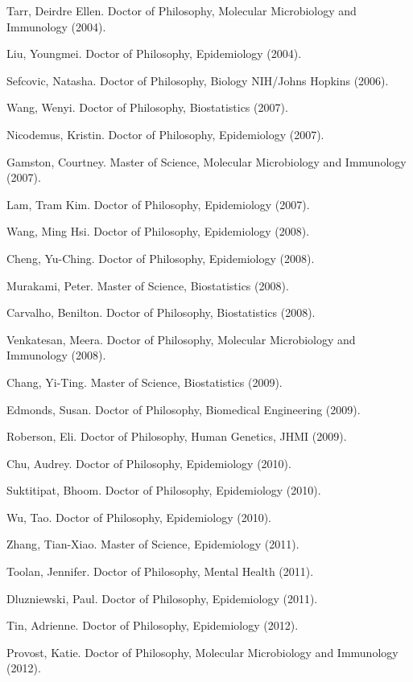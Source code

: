 \documentclass[10pt]{article}
\newcommand{\dn}[1]{{\color{black} {#1}}}
\begin{document}
\item \dn{Tarr}, Deirdre Ellen. Doctor of Philosophy, Molecular Microbiology and Immunology (2004).
\item \dn{Liu}, Youngmei. Doctor of Philosophy, Epidemiology (2004).
\item \dn{Sefcovic}, Natasha. Doctor of Philosophy, Biology NIH/Johns Hopkins (2006).
\item \dn{Wang}, Wenyi. Doctor of Philosophy, Biostatistics (2007).
\item \dn{Nicodemus}, Kristin. Doctor of Philosophy, Epidemiology (2007).
\item \dn{Gamston}, Courtney. Master of Science, Molecular Microbiology and Immunology (2007).
\item \dn{Lam}, Tram Kim. Doctor of Philosophy, Epidemiology (2007).
\item \dn{Wang}, Ming Hsi. Doctor of Philosophy, Epidemiology (2008).
\item \dn{Cheng}, Yu-Ching. Doctor of Philosophy, Epidemiology (2008).
\item \dn{Murakami}, Peter. Master of Science, Biostatistics (2008).
\item \dn{Carvalho}, Benilton. Doctor of Philosophy, Biostatistics (2008).
\item \dn{Venkatesan}, Meera. Doctor of Philosophy, Molecular Microbiology and Immunology (2008).
\item \dn{Chang}, Yi-Ting. Master of Science, Biostatistics (2009).
\item \dn{Edmonds}, Susan. Doctor of Philosophy, Biomedical Engineering (2009).
\item \dn{Roberson}, Eli. Doctor of Philosophy, Human Genetics, JHMI (2009).  
\item \dn{Chu}, Audrey. Doctor of Philosophy, Epidemiology (2010).
\item \dn{Suktitipat}, Bhoom. Doctor of Philosophy, Epidemiology (2010).
\item \dn{Wu}, Tao. Doctor of Philosophy, Epidemiology (2010).
\item \dn{Zhang}, Tian-Xiao. Master of Science, Epidemiology (2011).
\item \dn{Toolan}, Jennifer. Doctor of Philosophy, Mental Health (2011).
\item \dn{Dluzniewski}, Paul. Doctor of Philosophy, Epidemiology (2011).
\item \dn{Tin}, Adrienne. Doctor of Philosophy, Epidemiology (2012).
\item \dn{Provost}, Katie. Doctor of Philosophy, Molecular Microbiology and Immunology (2012).
\end{document}
